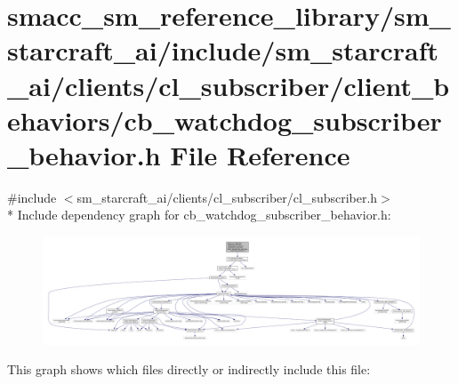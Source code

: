 \hypertarget{sm__starcraft__ai_2include_2sm__starcraft__ai_2clients_2cl__subscriber_2client__behaviors_2cb__wdfb3e50077225b2325e3a32b4e37e7e5}{}\section{smacc\+\_\+sm\+\_\+reference\+\_\+library/sm\+\_\+starcraft\+\_\+ai/include/sm\+\_\+starcraft\+\_\+ai/clients/cl\+\_\+subscriber/client\+\_\+behaviors/cb\+\_\+watchdog\+\_\+subscriber\+\_\+behavior.h File Reference}
\label{sm__starcraft__ai_2include_2sm__starcraft__ai_2clients_2cl__subscriber_2client__behaviors_2cb__wdfb3e50077225b2325e3a32b4e37e7e5}
{\ttfamily \#include $<$sm\+\_\+starcraft\+\_\+ai/clients/cl\+\_\+subscriber/cl\+\_\+subscriber.\+h$>$}\\*
Include dependency graph for cb\+\_\+watchdog\+\_\+subscriber\+\_\+behavior.\+h\+:
\nopagebreak
\begin{figure}[H]
\begin{center}
\leavevmode
\includegraphics[width=350pt]{sm__starcraft__ai_2include_2sm__starcraft__ai_2clients_2cl__subscriber_2client__behaviors_2cb__w45efd7d0ffb91dfad8633d34b059f4d2}
\end{center}
\end{figure}
This graph shows which files directly or indirectly include this file\+:
\nopagebreak
